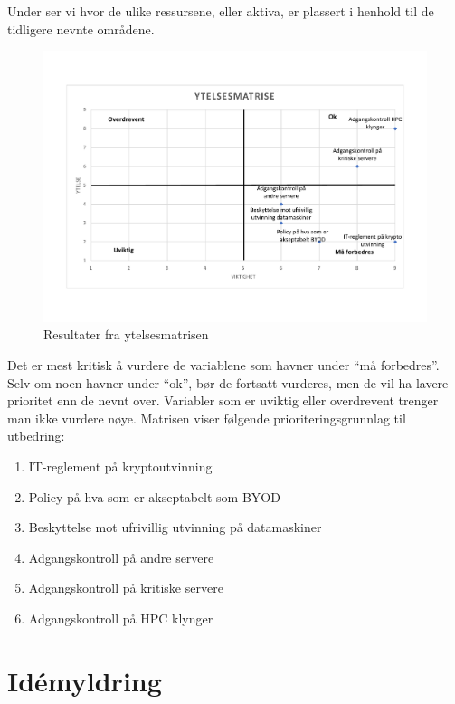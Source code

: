 Under ser vi hvor de ulike ressursene, eller aktiva, er plassert i henhold til de tidligere nevnte områdene.
\begin{figure}[H]
    \centering
    \includegraphics[scale=0.5]{case_3/bilder/ytelsesmatrise.pdf}
    \caption[Ytelsesmatrise]{Resultater fra ytelsesmatrisen}
    \label{fig:ytelsesmatrise}
\end{figure}

Det er mest kritisk å vurdere de variablene som havner under ``må forbedres''. Selv om noen havner under ``ok'', bør de fortsatt vurderes, men de vil ha lavere prioritet enn de nevnt over. Variabler som er uviktig eller overdrevent trenger man ikke vurdere nøye. Matrisen viser følgende prioriteringsgrunnlag til utbedring:

\begin{enumerate}
    \item IT-reglement på kryptoutvinning
    \item Policy på hva som er akseptabelt som BYOD
    \item Beskyttelse mot ufrivillig utvinning på datamaskiner
    \item Adgangskontroll på andre servere
    \item Adgangskontroll på kritiske servere
    \item Adgangskontroll på HPC klynger
\end{enumerate}

\section{Idémyldring}
